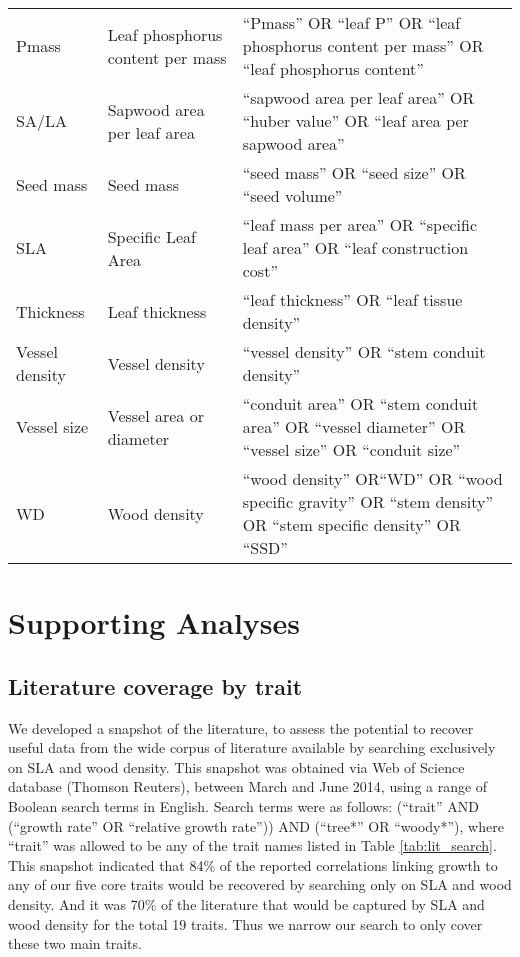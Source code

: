 \documentclass[10pt,twoside]{article}\usepackage[]{graphicx}\usepackage[]{color}
\begin{document}
\begin{table}[h!]
{\begin{tabular}{p{3cm}p{3cm}p{8cm}}
  Pmass & Leaf phosphorus content per mass & ``Pmass'' OR ``leaf P'' OR  ``leaf phosphorus content per mass'' OR ``leaf phosphorus content'' \\
  SA/LA & Sapwood area per leaf area & ``sapwood area per leaf area'' OR ``huber value'' OR ``leaf area per sapwood area'' \\
  Seed mass & Seed mass & ``seed mass'' OR ``seed size'' OR ``seed volume'' \\
  SLA & Specific Leaf Area & ``leaf mass per area'' OR ``specific leaf area'' OR ``leaf construction cost'' \\
  Thickness & Leaf thickness & ``leaf thickness''  OR ``leaf tissue density'' \\
  Vessel density & Vessel density & ``vessel density'' OR ``stem conduit density'' \\
  Vessel size & Vessel area or diameter & ``conduit area'' OR ``stem conduit area'' OR ``vessel diameter'' OR ``vessel size'' OR ``conduit size''   \\
  WD & Wood density & ``wood density'' OR``WD'' OR ``wood specific gravity'' OR ``stem density'' OR ``stem specific density'' OR ``SSD'' \\
   \hline
\end{tabular}
}
\end{table}

\clearpage

\section{Supporting Analyses}\label{app:supp_info_analyses}

\subsection{Literature coverage by trait}\label{app:literature-snapshot}

We developed a snapshot of the literature, to assess the potential to recover useful data from the wide corpus of literature available by searching exclusively on SLA and wood density. This snapshot was obtained via Web of Science database (Thomson Reuters), between March and June 2014, using a range of Boolean search terms in English. Search terms were as follows: (``trait'' AND (``growth rate'' OR ``relative growth rate'')) AND (``tree*'' OR ``woody*''), where ``trait'' was allowed to be any of the trait names listed in Table \ref{tab:lit_search}. This snapshot indicated that 84\% of the reported correlations linking growth to any of our five core traits would be recovered by searching only on SLA and wood density. And it was 70\% of the literature that would be captured by SLA and wood density for the total 19 traits. Thus we narrow our search to only cover these two main traits.
\end{document}
